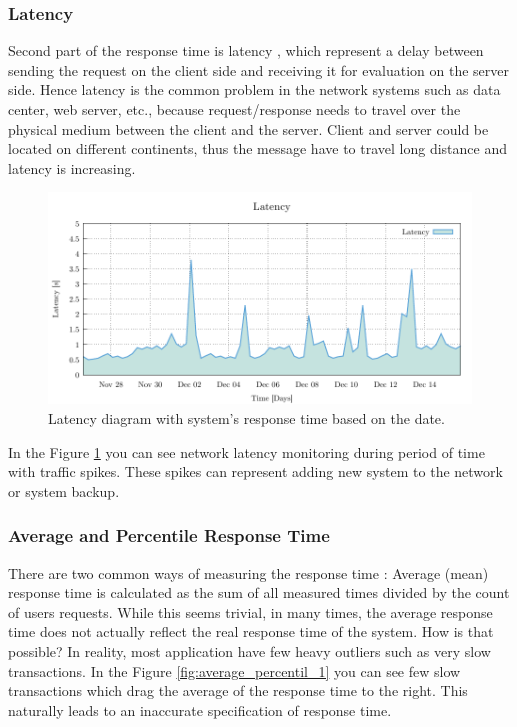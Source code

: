 \subsubsection*{Latency}
Second part of the response time is latency \cite{Broadwell:RPT, BHATT:PERF}, which represent a delay between sending the request on the client side and receiving it for evaluation on the server side. Hence latency is the common problem in the network systems such as data center, web server, etc., because request/response needs to travel over the physical medium between the client and the server. Client and server could be located on different continents, thus the message have to travel long distance and latency is increasing.  

\begin{figure}[H]
  \centering
  \includegraphics[width=15cm]{obrazky-figures/latency.pdf}
  \caption{Latency diagram with system's response time based on the date.}
  \label{fig:latency}
\end{figure}

In the Figure \ref{fig:latency} you can see network latency monitoring during period of time with traffic spikes. These spikes can represent adding new system to the network or system backup.

\subsubsection*{Average and Percentile Response Time}
There are two common ways of measuring the response time \cite{Kopp:RPT}: Average (mean) response time is calculated as the sum of all measured times divided by the count of users requests. While this seems trivial, in many times, the average response time does not actually reflect the real response time of the system. How is that possible? In reality, most application have few heavy outliers such as very slow transactions. In the Figure \ref{fig:average_percentil_1} you can see few slow transactions which drag the average of the response time to the right. This naturally leads to an inaccurate specification of response time.



